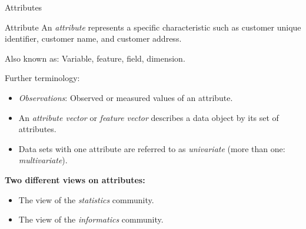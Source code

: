 \begin{frame}{Attributes}
	\begin{block}{Attribute}
		An \textit{attribute} represents a specific characteristic such as customer
		unique identifier, customer name, and customer address.
	\end{block}

	Also known as: Variable, feature, field, dimension.\\\medskip


	Further terminology:

	\begin{itemize}
		\item \textit{Observations}: Observed or measured values of an attribute.
		\item An \textit{attribute vector} or \textit{feature vector} describes a
		      data object by its set of attributes.
		\item Data sets with one attribute are referred to as \textit{univariate}
		      (more than one: \textit{multivariate}).
	\end{itemize}

	\textbf{Two different views on attributes:}
	\begin{itemize}
		\item The view of the \textit{statistics} community.
		\item The view of the \textit{informatics} community.
	\end{itemize}
\end{frame}

